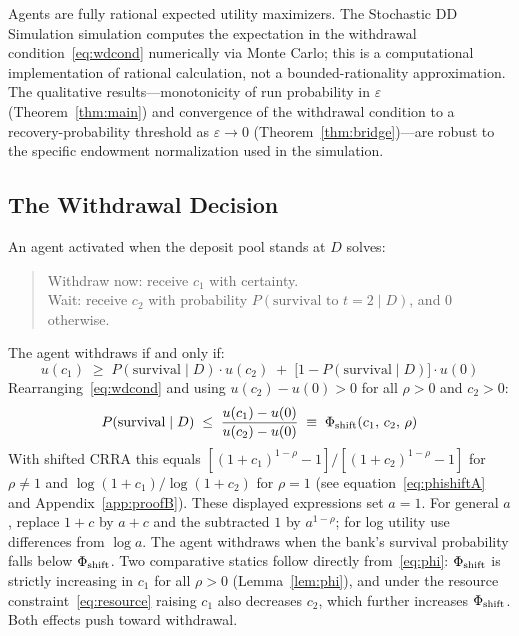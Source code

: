 \documentclass[12pt]{article}\usepackage[]{graphicx}\usepackage[]{xcolor}
\begin{document}
Agents are fully rational expected utility maximizers.
The Stochastic DD Simulation simulation computes the expectation in the withdrawal condition~\eqref{eq:wdcond} numerically via Monte Carlo; this is a computational implementation of rational calculation, not a bounded-rationality approximation.
The qualitative results---monotonicity of run probability in $\varepsilon$ (Theorem~\ref{thm:main}) and convergence of the withdrawal condition to a recovery-probability threshold as $\varepsilon \to 0$ (Theorem~\ref{thm:bridge})---are robust to the specific endowment normalization used in the simulation.

\subsection{The Withdrawal Decision}

An agent activated when the deposit pool stands at $D$ solves:

\begin{quote}
Withdraw now: receive $c_1$ with certainty. \\[2pt]
Wait: receive $c_2$ with probability
$P(\text{survival to } t=2 \mid D)$, and $0$ otherwise.
\end{quote}
%
The agent withdraws if and only if:
%
\begin{equation}
  u(c_1) \;\geq\;
  P(\text{survival} \mid D)\cdot u(c_2) \;+\;
  \bigl[1 - P(\text{survival} \mid D)\bigr]\cdot u(0)
  \label{eq:wdcond}
\end{equation}
%
Rearranging~\eqref{eq:wdcond} and using $u(c_2)-u(0)>0$ for all $\rho>0$ and $c_2>0$:
%
\begin{equation}
  P(\text{survival} \mid D) \;\leq\;
  \frac{u(c_1)-u(0)}{u(c_2)-u(0)}
  \;\equiv\; \Phi_{\rm shift}(c_1,\,c_2,\,\rho)
  \label{eq:phi}
\end{equation}
%
With shifted CRRA this equals $[(1+c_1)^{1-\rho}-1]/[(1+c_2)^{1-\rho}-1]$ for $\rho\neq 1$ and $\log(1+c_1)/\log(1+c_2)$ for $\rho=1$ (see equation~\eqref{eq:phishiftA} and Appendix~\ref{app:proofB}).
These displayed expressions set $a=1$.
For general $a$, replace $1+c$ by $a+c$ and the subtracted $1$ by $a^{1-\rho}$; for log utility use differences from $\log a$.
The agent withdraws when the bank's survival probability falls below $\Phi_{\rm shift}$.
Two comparative statics follow directly from~\eqref{eq:phi}: $\Phi_{\rm shift}$ is strictly increasing in $c_1$ for all $\rho>0$ (Lemma~\ref{lem:phi}), and under the resource constraint~\eqref{eq:resource} raising $c_1$ also decreases $c_2$, which further increases $\Phi_{\rm shift}$.
Both effects push toward withdrawal.
\end{document}

